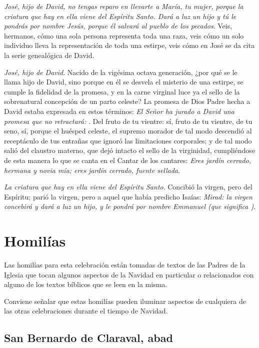 \begin{body}
\begin{body}
\emph{José, hijo de David, no tengas reparo en llevarte a María, tu mujer, porque la criatura que hay en ella viene del Espíritu Santo. Dará a luz un hijo y tú le pondrás por nombre Jesús, porque él salvará al pueblo de los pecados}. Veis, hermanos, cómo una sola persona representa toda una raza, veis cómo un solo individuo lleva la representación de toda una estirpe, veis cómo en José se da cita la serie genealógica de David.

\emph{José, hijo de David}. Nacido de la vigésima octava generación, ¿por qué se le llama hijo de David, sino porque en él se desvela el misterio de una estirpe, se cumple la fidelidad de la promesa, y en la carne virginal luce ya el sello de la sobrenatural concepción de un parto celeste? La promesa de Dios Padre hecha a David estaba expresada en estos términos: \emph{El Señor ha jurado a David una promesa que no retractará: }. Del fruto de tu vientre: sí, fruto de tu vientre, de tu seno, sí, porque el huésped celeste, el supremo morador de tal modo descendió al receptáculo de tus entrañas que ignoró las limitaciones corporales; y de tal modo salió del claustro materno, que dejó intacto el sello de la virginidad, cumpliéndose de esta manera lo que se canta en el Cantar de los cantares: \emph{Eres jardín cerrado, hermana y novia mía; eres jardín cerrado, fuente sellada}.

\emph{La criatura que hay en ella viene del Espíritu Santo}. Concibió la virgen, pero del Espíritu; parió la virgen, pero a aquel que había predicho Isaías: \emph{Mirad: la virgen concebirá y dará a luz un hijo, y le pondrá por nombre Emmanuel (que significa )}.


\section{Homilías}

Las homilías para esta celebración están tomadas de textos de las Padres de la Iglesia que tocan algunos aspectos de la Navidad en particular o relacionados con alguno de los textos bíblicos que se leen en la misma.

Conviene señalar que estas homilías pueden iluminar aspectos de cualquiera de las otras celebraciones durante el tiempo de Navidad.

\subsection{San Bernardo de Claraval, abad}


\end{body}
\end{body}
